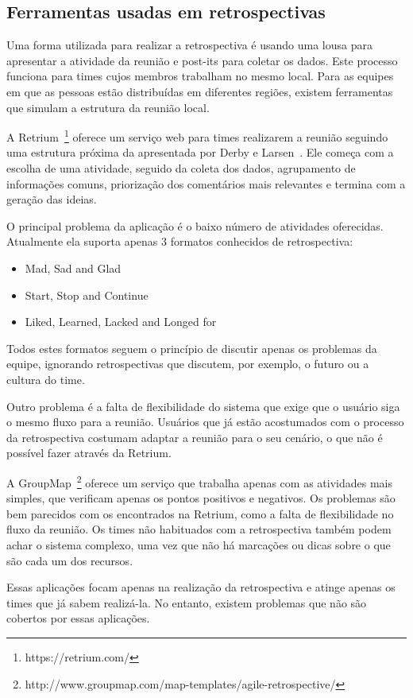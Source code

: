 \subsection{Ferramentas usadas em retrospectivas}

Uma forma utilizada para realizar a retrospectiva é usando uma lousa para apresentar a atividade da reunião e post-its para coletar os dados. Este processo funciona para times cujos membros trabalham no mesmo local. Para as equipes em que as pessoas estão distribuídas em diferentes regiões, existem ferramentas que simulam a estrutura da reunião local.

A Retrium~\footnote{https://retrium.com/} oferece um serviço web para times realizarem a reunião seguindo uma estrutura próxima da apresentada por Derby e Larsen~\cite{retrospectives}. Ele começa com a escolha de uma atividade, seguido da coleta dos dados, agrupamento de informações comuns, priorização dos comentários mais relevantes e termina com a geração das ideias.

O principal problema da aplicação é o baixo número de atividades oferecidas. Atualmente ela suporta apenas 3 formatos conhecidos de retrospectiva:

\begin{itemize}
	\item Mad, Sad and Glad
	\item Start, Stop and Continue
	\item Liked, Learned, Lacked and Longed for
\end{itemize}

Todos estes formatos seguem o princípio de discutir apenas os problemas da equipe, ignorando retrospectivas que discutem, por exemplo, o futuro ou a cultura do time. 

Outro problema é a falta de flexibilidade do sistema que exige que o usuário siga o mesmo fluxo para a reunião. Usuários que já estão acostumados com o processo da retrospectiva costumam adaptar a reunião para o seu cenário, o que não é possível fazer através da Retrium.

A GroupMap~\footnote{http://www.groupmap.com/map-templates/agile-retrospective/} oferece um serviço que trabalha apenas com as atividades mais simples, que verificam apenas os pontos positivos e negativos. Os problemas são bem parecidos com os encontrados na Retrium, como a falta de flexibilidade no fluxo da reunião. Os times não habituados com a retrospectiva também podem achar o sistema complexo, uma vez que não há marcações ou dicas sobre o que são cada um dos recursos.

Essas aplicações focam apenas na realização da retrospectiva e atinge apenas os times que já sabem realizá-la. No entanto, existem problemas que não são cobertos por essas aplicações.